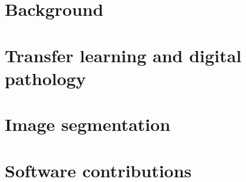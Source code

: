 % 
\pagestyle{empty}



\frontmatter






\mainmatter
\pagestyle{scrheadings}



\part{Background}
\label{part:background}



\part{Transfer learning and digital pathology}
\label{part:transfer}



\part{Image segmentation}
\label{part:segmentation}


\part{Software contributions}
\label{part:software}


\backmatter

\appendix


\newpage

\listoffigures
\listoftables

\printbibliography

